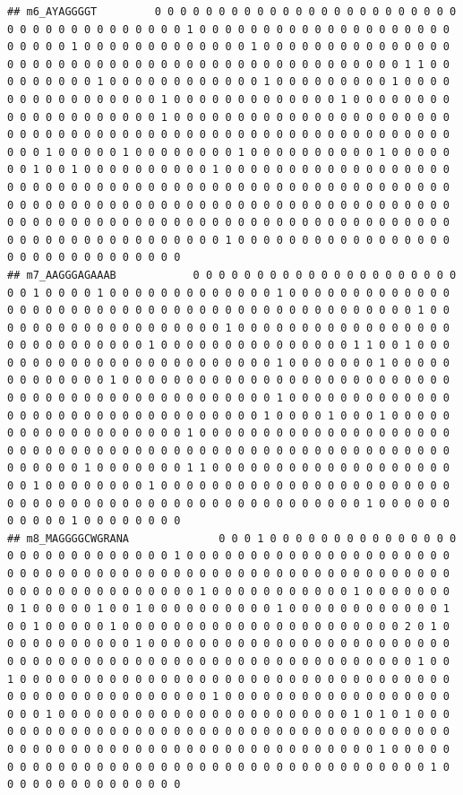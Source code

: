 \documentclass[
]{book}
\begin{document}
\begin{verbatim}
## m6_AYAGGGGT         0 0 0 0 0 0 0 0 0 0 0 0 0 0 0 0 0 0 0 0 0 0 0 0 0 0 0 0 0 0 0 0 0 0 0 0 0 0 1 0 0 0 0 0 0 0 0 0 0 0 0 0 0 0 0 0 0 0 0 0 0 0 0 0 1 0 0 0 0 0 0 0 0 0 0 0 0 0 1 0 0 0 0 0 0 0 0 0 0 0 0 0 0 0 0 0 0 0 0 0 0 0 0 0 0 0 0 0 0 0 0 0 0 0 0 0 0 0 0 0 0 0 0 0 0 1 1 0 0 0 0 0 0 0 0 0 1 0 0 0 0 0 0 0 0 0 0 0 0 1 0 0 0 0 0 0 0 0 0 1 0 0 0 0 0 0 0 0 0 0 0 0 0 0 0 0 1 0 0 0 0 0 0 0 0 0 0 0 0 0 1 0 0 0 0 0 0 0 0 0 0 0 0 0 0 0 0 0 0 0 0 1 0 0 0 0 0 0 0 0 0 0 0 0 0 0 0 0 0 0 0 0 0 0 0 0 0 0 0 0 0 0 0 0 0 0 0 0 0 0 0 0 0 0 0 0 0 0 0 0 0 0 0 0 0 0 0 0 0 0 0 0 1 0 0 0 0 0 1 0 0 0 0 0 0 0 0 1 0 0 0 0 0 0 0 0 0 0 1 0 0 0 0 0 0 0 1 0 0 1 0 0 0 0 0 0 0 0 0 0 1 0 0 0 0 0 0 0 0 0 0 0 0 0 0 0 0 0 0 0 0 0 0 0 0 0 0 0 0 0 0 0 0 0 0 0 0 0 0 0 0 0 0 0 0 0 0 0 0 0 0 0 0 0 0 0 0 0 0 0 0 0 0 0 0 0 0 0 0 0 0 0 0 0 0 0 0 0 0 0 0 0 0 0 0 0 0 0 0 0 0 0 0 0 0 0 0 0 0 0 0 0 0 0 0 0 0 0 0 0 0 0 0 0 0 0 0 0 0 0 0 0 0 0 0 0 0 0 0 0 0 0 0 0 0 0 0 0 0 0 0 1 0 0 0 0 0 0 0 0 0 0 0 0 0 0 0 0 0 0 0 0 0 0 0 0 0 0 0 0 0 0 0
## m7_AAGGGAGAAAB            0 0 0 0 0 0 0 0 0 0 0 0 0 0 0 0 0 0 0 0 0 0 0 1 0 0 0 0 1 0 0 0 0 0 0 0 0 0 0 0 0 0 1 0 0 0 0 0 0 0 0 0 0 0 0 0 0 0 0 0 0 0 0 0 0 0 0 0 0 0 0 0 0 0 0 0 0 0 0 0 0 0 0 0 0 0 0 0 1 0 0 0 0 0 0 0 0 0 0 0 0 0 0 0 0 0 0 0 1 0 0 0 0 0 0 0 0 0 0 0 0 0 0 0 0 0 0 0 0 0 0 0 0 0 0 0 0 1 0 0 0 0 0 0 0 0 0 0 0 0 0 0 0 1 1 0 0 1 0 0 0 0 0 0 0 0 0 0 0 0 0 0 0 0 0 0 0 0 0 0 0 0 1 0 0 0 0 0 0 0 1 0 0 0 0 0 0 0 0 0 0 0 0 0 1 0 0 0 0 0 0 0 0 0 0 0 0 0 0 0 0 0 0 0 0 0 0 0 0 0 0 0 0 0 0 0 0 0 0 0 0 0 0 0 0 0 0 0 0 0 0 0 1 0 0 0 0 0 0 0 0 0 0 0 0 0 0 0 0 0 0 0 0 0 0 0 0 0 0 0 0 0 0 0 0 0 1 0 0 0 0 1 0 0 0 1 0 0 0 0 0 0 0 0 0 0 0 0 0 0 0 0 0 0 0 1 0 0 0 0 0 0 0 0 0 0 0 0 0 0 0 0 0 0 0 0 0 0 0 0 0 0 0 0 0 0 0 0 0 0 0 0 0 0 0 0 0 0 0 0 0 0 0 0 0 0 0 0 0 0 0 0 0 0 0 0 0 1 0 0 0 0 0 0 0 1 1 0 0 0 0 0 0 0 0 0 0 0 0 0 0 0 0 0 0 0 0 0 1 0 0 0 0 0 0 0 0 1 0 0 0 0 0 0 0 0 0 0 0 0 0 0 0 0 0 0 0 0 0 0 0 0 0 0 0 0 0 0 0 0 0 0 0 0 0 0 0 0 0 0 0 0 0 0 0 0 0 0 0 1 0 0 0 0 0 0 0 0 0 0 0 1 0 0 0 0 0 0 0 0
## m8_MAGGGGCWGRANA              0 0 0 1 0 0 0 0 0 0 0 0 0 0 0 0 0 0 0 0 0 0 0 0 0 0 0 0 0 0 0 0 1 0 0 0 0 0 0 0 0 0 0 0 0 0 0 0 0 0 0 0 0 0 0 0 0 0 0 0 0 0 0 0 0 0 0 0 0 0 0 0 0 0 0 0 0 0 0 0 0 0 0 0 0 0 0 0 0 0 0 0 0 0 0 0 0 0 0 0 0 0 0 0 1 0 0 0 0 0 0 0 0 0 0 0 1 0 0 0 0 0 0 0 0 1 0 0 0 0 0 1 0 0 1 0 0 0 0 0 0 0 0 0 0 1 0 0 0 0 0 0 0 0 0 0 0 0 1 0 0 1 0 0 0 0 0 1 0 0 0 0 0 0 0 0 0 0 0 0 0 0 0 0 0 0 0 0 0 0 2 0 1 0 0 0 0 0 0 0 0 0 0 0 1 0 0 0 0 0 0 0 0 0 0 0 0 0 0 0 0 0 0 0 0 0 0 0 0 0 0 0 0 0 0 0 0 0 0 0 0 0 0 0 0 0 0 0 0 0 0 0 0 0 0 0 0 0 0 0 0 1 0 0 1 0 0 0 0 0 0 0 0 0 0 0 0 0 0 0 0 0 0 0 0 0 0 0 0 0 0 0 0 0 0 0 0 0 0 0 0 0 0 0 0 0 0 0 0 0 0 0 0 0 0 1 0 0 0 0 0 0 0 0 0 0 0 0 0 0 0 0 0 0 0 0 0 1 0 0 0 0 0 0 0 0 0 0 0 0 0 0 0 0 0 0 0 0 0 0 0 1 0 1 0 1 0 0 0 0 0 0 0 0 0 0 0 0 0 0 0 0 0 0 0 0 0 0 0 0 0 0 0 0 0 0 0 0 0 0 0 0 0 0 0 0 0 0 0 0 0 0 0 0 0 0 0 0 0 0 0 0 0 0 0 0 0 0 0 0 0 0 0 1 0 0 0 0 0 0 0 0 0 0 0 0 0 0 0 0 0 0 0 0 0 0 0 0 0 0 0 0 0 0 0 0 0 0 0 0 0 0 1 0 0 0 0 0 0 0 0 0 0 0 0 0 0 0

\end{verbatim}
\end{document}
